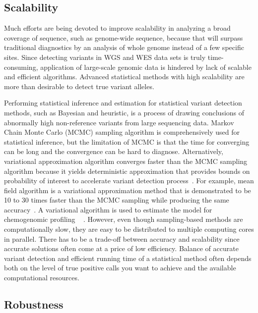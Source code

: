 \documentclass[a4,center,fleqn]{NAR}
\begin{document}
\subsection{Scalability}

Much efforts are being devoted to improve scalability in analyzing a broad coverage of sequence, such as genome-wide sequence, because that will surpass traditional diagnostics by an analysis of whole genome instead of a few specific sites.
Since detecting variants in WGS and WES data sets is truly time-consuming, application of large-scale genomic data is hindered by lack of scalable and efficient algorithms.
Advanced statistical methods with high scalability are more than desirable to detect true variant alleles.

Performing statistical inference and estimation for statistical variant detection methods, such as Bayesian and heuristic, is a process of drawing conclusions of abnormally high non-reference variants from large sequencing data. 
Markov Chain Monte Carlo (MCMC) sampling algorithm is comprehensively used for statistical inference, but the limitation of MCMC is that the time for converging can be long and the convergence can be hard to diagnose.
Alternatively, variational approximation algorithm converges faster than the MCMC sampling algorithm because it yields deterministic approximation that provides bounds on probability of interest to accelerate variant detection process~\citep{jordan1999introduction}.
For example, mean field algorithm is a variational approximation method that is demonstrated to be 10 to 30 times faster than the MCMC sampling while producing the same accuracy~\citep{peterson1989explorations}.
A variational algorithm is used to estimate the model for chemogenomic profiling ~\citep{flaherty2005latent} .
However, even though sampling-based methods are computationally slow, they are easy to be distributed to multiple computing cores in parallel.
There has to be a trade-off between accuracy and scalability since accurate solutions often come at a price of low efficiency.
Balance of accurate variant detection and efficient running time of a statistical method often depends both on the level of true positive calls you want to achieve and the available computational resources.

\subsection{Robustness}
\end{document}

